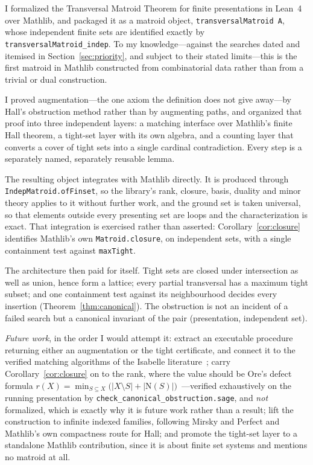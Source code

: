 \documentclass[11pt]{article}
\newcommand{\lean}[1]{\texttt{#1}}
\newcommand{\N}{\mathrm{N}}
\begin{document}
I formalized the Transversal Matroid Theorem for finite presentations in Lean~4 over Mathlib,
and packaged it as a matroid object, \lean{transversalMatroid A}, whose independent finite sets
are identified exactly by \lean{transversalMatroid\_indep}. To my knowledge---against the searches
dated and itemised in Section~\ref{sec:priority}, and subject to their stated limits---this is the
first matroid in Mathlib constructed from combinatorial data rather than from a trivial or dual
construction.

I proved augmentation---the one axiom the definition does not give away---by Hall's obstruction
method rather than by augmenting paths, and organized that proof into three independent layers:
a matching interface over Mathlib's finite Hall theorem, a tight-set layer with its own algebra,
and a counting layer that converts a cover of tight sets into a single cardinal contradiction.
Every step is a separately named, separately reusable lemma.

{\sloppy The resulting object integrates with Mathlib directly. It is produced through
\lean{IndepMatroid.ofFinset}, so the library's rank, closure, basis, duality and minor theory
applies to it without further work, and the ground set is taken universal, so that elements
outside every presenting set are loops and the characterization is exact. That integration is
exercised rather than asserted: Corollary~\ref{cor:closure} identifies Mathlib's own
\lean{Matroid.closure}, on independent sets, with a single containment test against
\lean{maxTight}.\par}

The architecture then paid for itself. Tight sets are closed under intersection as well as
union, hence form a lattice; every partial transversal has a maximum tight subset; and one
containment test against its neighbourhood decides every insertion
(Theorem~\ref{thm:canonical}). The obstruction is not an incident of a failed search but a
canonical invariant of the pair (presentation, independent set).

\emph{Future work}, in the order I would attempt it: extract an executable procedure returning
either an augmentation or the tight certificate, and connect it to the verified matching
algorithms of the Isabelle literature~\cite{itp2025}; carry Corollary~\ref{cor:closure} on to the
rank, where the value should be Ore's defect formula
$r(X)=\min_{S\subseteq X}\bigl(|X\setminus S|+|\N(S)|\bigr)$~\cite{ore}---verified exhaustively on
the running presentation by \lean{check\_canonical\_obstruction.sage}, and \emph{not} formalized,
which is exactly why it is future work rather than a result; lift the construction to
infinite indexed families, following Mirsky and Perfect and Mathlib's own compactness route for
Hall; and promote the tight-set layer to a standalone Mathlib contribution, since it is about
finite set systems and mentions no matroid at all.
\end{document}
